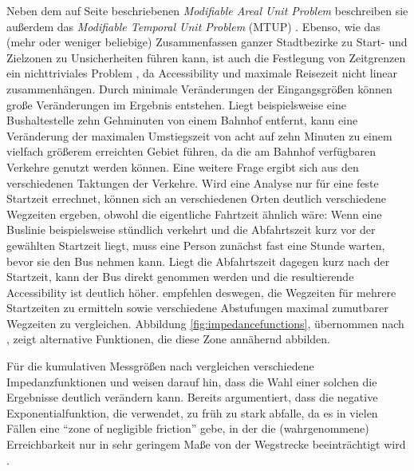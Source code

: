 \documentclass[11pt,pdftex,a4paper]{scrartcl}
\begin{document}
	\label{par:MTUP}
	Neben dem auf Seite \pageref{par:MAUP} beschriebenen \textit{Modifiable Areal Unit Problem} beschreiben sie außerdem das \textit{Modifiable Temporal Unit Problem} (MTUP) \parencites[ursprünglich bei][]{coltekinModifiableTemporalUnit2011}[Untersuchungen des Einflusses des MTUP auf Accessibility-Studien u.a. bei][]{farberTemporalVariabilityTransitbased2014}{cuiMeasuringAddedEffectiveness2019}{stepniakImpactTemporalResolution2019}{lindnerWhenMeasureAccessibility2024}. Ebenso, wie das (mehr oder weniger beliebige) Zusammenfassen ganzer Stadtbezirke zu Start- und Zielzonen zu Unsicherheiten führen kann, ist auch die Festlegung von Zeitgrenzen ein nichttriviales Problem \parencite[vgl.][]{xiExploringImpactDifferent2018}, da Accessibility und maximale Reisezeit nicht linear zusammenhängen. Durch minimale Veränderungen der Eingangsgrößen können große Veränderungen im Ergebnis entstehen. Liegt beispielsweise eine Bushaltestelle zehn Gehminuten von einem Bahnhof entfernt, kann eine Veränderung der maximalen Umstiegszeit von acht auf zehn Minuten zu einem vielfach größerem erreichten Gebiet führen, da die am Bahnhof verfügbaren Verkehre genutzt werden können. Eine weitere Frage ergibt sich aus den verschiedenen Taktungen der Verkehre. Wird eine Analyse nur für eine feste Startzeit errechnet, können sich an verschiedenen Orten deutlich verschiedene Wegzeiten ergeben, obwohl die eigentliche Fahrtzeit ähnlich wäre: Wenn eine Buslinie beispielsweise stündlich verkehrt und die Abfahrtszeit kurz vor der gewählten Startzeit liegt, muss eine Person zunächst fast eine Stunde warten, bevor sie den Bus nehmen kann. Liegt die Abfahrtszeit dagegen kurz nach der Startzeit, kann der Bus direkt genommen werden und die resultierende Accessibility ist deutlich höher. \textcite[81]{levinsonTransportAccessManual2020} empfehlen deswegen, die Wegzeiten für mehrere Startzeiten zu ermitteln sowie verschiedene Abstufungen maximal zumutbarer Wegzeiten zu vergleichen. Abbildung \ref{fig:impedancefunctions}, übernommen nach \textcite{levinsonTransportAccessManual2020}, zeigt alternative Funktionen, die diese Zone annähernd abbilden.
	
	Für die kumulativen Messgrößen nach \textcite{handyMeasuringAccessibilityExploration1997} vergleichen \textcite{levinsonTransportAccessManual2020} verschiedene Impedanzfunktionen und weisen darauf hin, dass die Wahl einer solchen die Ergebnisse deutlich verändern kann. Bereits \citeauthor{ingramConceptAccessibilitySearch1971} argumentiert, dass die negative Exponentialfunktion, die \citeauthor{hansenHowAccessibilityShapes1959} verwendet, zu früh zu stark abfalle, da es in vielen Fällen eine \enquote{zone of negligible friction} gebe, in der die (wahrgenommene) Erreichbarkeit nur in sehr geringem Maße von der Wegstrecke beeinträchtigt wird \parencite[104]{ingramConceptAccessibilitySearch1971}. 
	
\end{document}

